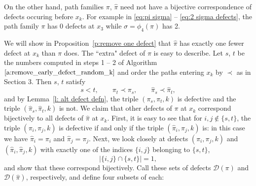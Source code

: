 \documentclass[12pt]{amsart}
\theoremstyle{definition}
\numberwithin{equation}{section}
\newcommand{\D}{\mathcal{D}}
\newcommand{\ctr}[1]{{x}_{#1}}
\begin{document}
    On the other hand, path families $\pi$, $\hat \pi$ 
    need not have a bijective correspondence of defects occuring before $x_k$.
    For example in \eqref{eq:pi sigma} -- \eqref{eq:2 sigma defects}, the path family $\pi$ has 0 defects at $\ctr 3$ while $\sigma = \phi_4(\pi)$ has 2.
    
    We will show in Proposition~\ref{p:remove one defect} that
    $\hat \pi$ has exactly one fewer defect at $x_k$ than $\pi$ does.  The ``extra" defect of $\pi$ is easy to describe.    
  Let 
  $s$, $t$
be the numbers computed in steps 1 -- 2 of 
Algorithm~$\ref{a:remove_early_defect_random_k}$ and order the paths entering $\ctr k$ by $\prec$ as in Section 3.
Then 
$s$, $t$ satisfy 
\begin{equation}\label{eq:st}
s < t, 
\qquad
\pi_t \prec 
\pi_s,
\qquad
\hat\pi_s \prec \hat\pi_t,
\end{equation}
and by Lemma~\ref{l: alt defect defn}, the triple
$(\pi_s, \pi_t, k)$ is defective and the triple $(\hat\pi_s,\hat\pi_t,k)$ is not.
We claim that other defects of $\pi$ at $\ctr k$ correspond bijectively to all defects of $\hat \pi$ at $\ctr k$.
First, it is easy to see that for $i, j \not\in \{ s, t\}$, the triple
$(\pi_i,\pi_j,k)$ is defective if and only if the triple $(\hat \pi_i, \hat\pi_j, k)$ is:
in this case we have $\hat \pi_i = \pi_i$ and $\hat \pi_j = \pi_j$.
Next, we look closely
at defects $(\pi_i, \pi_j, k)$ and $(\hat \pi_i, \hat \pi_j, k)$ 
%
with exactly one of the indices $\{i, j\}$ belonging to $\{s,t\}$,
\begin{equation}\label{eq:ijst3}
    |\{i,j\}\cap\{s,t\}|=1,
\end{equation}
and show that these correspond bijectively. Call these sets of defects $\D(\pi)$ and $\D(\hat\pi)$, respectively,
and define four subsets of each:
\end{document}
